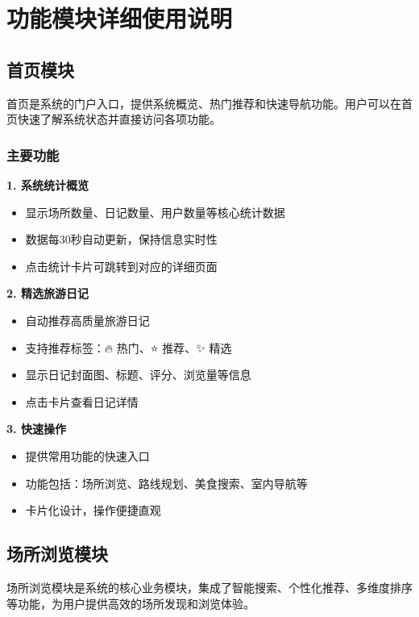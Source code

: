 \documentclass[12pt, a4paper]{article}
\begin{document}
\section{功能模块详细使用说明}

\subsection{首页模块}

\begin{infobox}[title={功能概述}]
首页是系统的门户入口，提供系统概览、热门推荐和快速导航功能。用户可以在首页快速了解系统状态并直接访问各项功能。
\end{infobox}

\subsubsection{主要功能}

\textbf{1. 系统统计概览}
\begin{itemize}
    \item 显示场所数量、日记数量、用户数量等核心统计数据
    \item 数据每30秒自动更新，保持信息实时性
    \item 点击统计卡片可跳转到对应的详细页面
\end{itemize}

\textbf{2. 精选旅游日记}
\begin{itemize}
    \item 自动推荐高质量旅游日记
    \item 支持推荐标签：🔥 热门、⭐ 推荐、✨ 精选
    \item 显示日记封面图、标题、评分、浏览量等信息
    \item 点击卡片查看日记详情
\end{itemize}

\textbf{3. 快速操作}
\begin{itemize}
    \item 提供常用功能的快速入口
    \item 功能包括：场所浏览、路线规划、美食搜索、室内导航等
    \item 卡片化设计，操作便捷直观
\end{itemize}

\subsection{场所浏览模块}

\begin{successbox}[title={核心功能}]
场所浏览模块是系统的核心业务模块，集成了智能搜索、个性化推荐、多维度排序等功能，为用户提供高效的场所发现和浏览体验。
\end{successbox}
\end{document}
